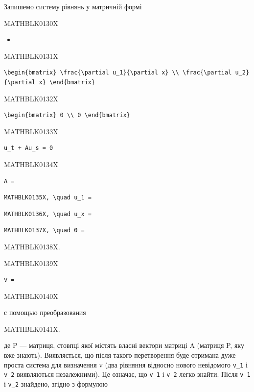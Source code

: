 \documentclass[
  ukrainian,
]{article}
\providecommand{\tightlist}{%
  \setlength{\itemsep}{0pt}\setlength{\parskip}{0pt}}
\begin{document}
Запишемо систему рівнянь у матричній формі

MATHBLK0130X

\begin{itemize}
\tightlist
\item
\end{itemize}

MATHBLK0131X

\begin{verbatim}
\begin{bmatrix} \frac{\partial u_1}{\partial x} \\ \frac{\partial u_2}{\partial x} \end{bmatrix}
\end{verbatim}

MATHBLK0132X

\begin{verbatim}
\begin{bmatrix} 0 \\ 0 \end{bmatrix}
\end{verbatim}

MATHBLK0133X

\begin{verbatim}
u_t + Au_s = 0
\end{verbatim}

MATHBLK0134X

\begin{verbatim}
A =
\end{verbatim}

\begin{verbatim}
MATHBLK0135X, \quad u_1 =
\end{verbatim}

\begin{verbatim}
MATHBLK0136X, \quad u_x =
\end{verbatim}

\begin{verbatim}
MATHBLK0137X, \quad 0 =
\end{verbatim}

MATHBLK0138X.

MATHBLK0139X

\begin{verbatim}
v =
\end{verbatim}

MATHBLK0140X

с помощью преобразования

MATHBLK0141X.

де P --- матриця, стовпці якої містять власні вектори матриці A (матриця
P, яку вже знають). Виявляється, що після такого перетворення буде
отримана дуже проста система для визначення v (два рівняння відносно
нового невідомого \texttt{v\_1} і \texttt{v\_2} виявляються
незалежними). Це означає, що \texttt{v\_1} і \texttt{v\_2} легко знайти.
Після \texttt{v\_1} і \texttt{v\_2} знайдено, згідно з формулою
\end{document}
